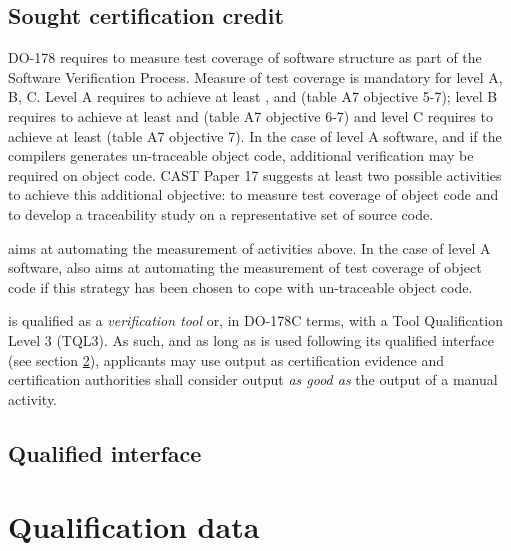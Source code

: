 \documentclass {report}
\begin{document}
\section {Sought certification credit}
DO-178 requires to measure test coverage of software structure as part of the Software Verification Process. Measure of test coverage is mandatory for level A, B, C. Level A requires to achieve at least \mcdc, \dc and \stc (table A7 objective 5-7); level B requires to achieve at least \dc and \stc (table A7 objective 6-7) and level C requires to achieve at least \stc (table A7 objective 7). In the case of level A software, and if the compilers generates un-traceable object code, additional verification may be required on object code. CAST Paper 17 suggests at least two possible activities to achieve this additional objective: to measure test coverage of object code and to develop a traceability study on a representative set of source code.

\xcov aims at automating the measurement of activities above. In the case of level A software, \xcov also aims at automating the measurement of test coverage of object code if this strategy has been chosen to cope with un-traceable object code.

\xcov is qualified as a \emph{verification tool} or, in DO-178C terms, with a Tool Qualification Level 3 (TQL3). As such, and as long as \xcov is used following its qualified interface (see section \ref{sec:qual-interface}), applicants may use \xcov output as certification evidence and certification authorities shall consider \xcov output \emph{as good as} the output of a manual activity.

\section{Qualified interface}
\label{sec:qual-interface}

\chapter{Qualification data}
\end{document}
